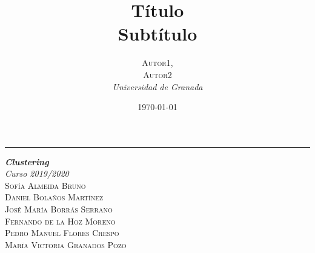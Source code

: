 \documentclass[a4paper, 20pt]{article}
\title{\textbf{Título}\\ %
Subtítulo} %
\author{\textsc{Autor1,\\Autor2} %
\\{\textit{Universidad de Granada}}} %
\date{\today} %
\begin{document}

\begin{titlepage} %
	
	\raggedleft %
	
	\rule{1pt}{\textheight} %
	\hspace{0.05\textwidth} %
	\parbox[b]{0.8\textwidth}{ %
		
		{\Huge\bfseries \textit{Clustering}}\\[2\baselineskip] %
		{\large\textit{Curso 2019/2020}}\\[4\baselineskip] %
		{\Large\textsc{Sofía Almeida Bruno}\\\textsc{Daniel Bolaños Martínez}\\\textsc{José María Borrás Serrano}\\\textsc{Fernando de la Hoz Moreno}\\\textsc{Pedro Manuel Flores Crespo}\\\textsc{María Victoria Granados Pozo}} %
		
		\vspace{0.4\textheight} %
		
		{\noindent }\\[\baselineskip] %
	}

\end{titlepage}


\end{document}
